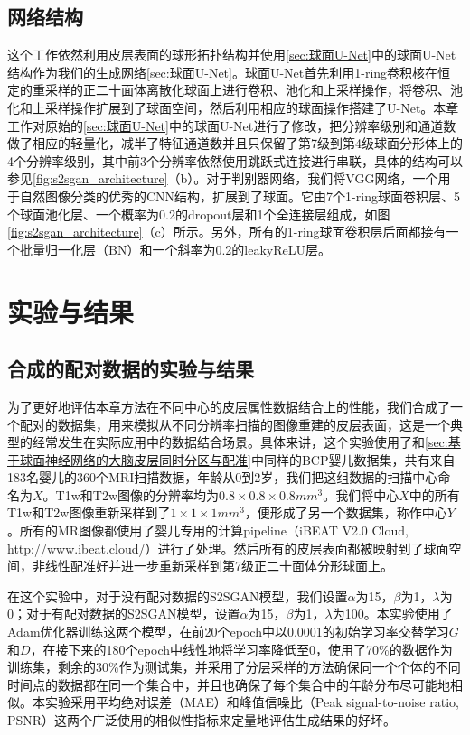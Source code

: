 \subsection{网络结构}
这个工作依然利用皮层表面的球形拓扑结构并使用\ref{sec:球面U-Net}中的球面U-Net结构作为我们的生成网络\ref{sec:球面U-Net}。球面U-Net首先利用1-ring卷积核在恒定的重采样的正二十面体离散化球面上进行卷积、池化和上采样操作，将卷积、池化和上采样操作扩展到了球面空间，然后利用相应的球面操作搭建了U-Net。本章工作对原始的\ref{sec:球面U-Net}中的球面U-Net进行了修改，把分辨率级别和通道数做了相应的轻量化，减半了特征通道数并且只保留了第7级到第4级球面分形体上的4个分辨率级别，其中前3个分辨率依然使用跳跃式连接进行串联，具体的结构可以参见\ref{fig:s2sgan_architecture}（b）。对于判别器网络，我们将VGG\cite{simonyan2014very}网络，一个用于自然图像分类的优秀的CNN结构，扩展到了球面。它由7个1-ring球面卷积层、5个球面池化层、一个概率为0.2的dropout层和1个全连接层组成，如图\ref{fig:s2sgan_architecture}（c）所示。另外，所有的1-ring球面卷积层后面都接有一个批量归一化层（BN）和一个斜率为0.2的leakyReLU层。

	

\section{实验与结果}

\subsection{合成的配对数据的实验与结果}\label{sec:Synthetic}
为了更好地评估本章方法在不同中心的皮层属性数据结合上的性能，我们合成了一个配对的数据集，用来模拟从不同分辨率扫描的图像重建的皮层表面，这是一个典型的经常发生在实际应用中的数据结合场景。具体来讲，这个实验使用了和\ref{sec:基于球面神经网络的大脑皮层同时分区与配准}中同样的BCP\cite{howell2019unc}婴儿数据集，共有来自183名婴儿的360个MRI扫描数据，年龄从0到2岁，我们把这组数据的扫描中心命名为$X$。T1w和T2w图像的分辨率均为$0.8\times 0.8\times 0.8mm^3$。我们将中心$X$中的所有T1w和T2w图像重新采样到了$1\times 1\times 1mm^3$，便形成了另一个数据集，称作中心$Y$。所有的MR图像都使用了婴儿专用的计算pipeline（iBEAT V2.0 Cloud, http://www.ibeat.cloud/）进行了处理。然后所有的皮层表面都被映射到了球面空间，非线性配准好并进一步重新采样到第7级正二十面体分形球面上。

在这个实验中，对于没有配对数据的S2SGAN模型，我们设置$\alpha$为15，$\beta$为1，$\lambda$为0；对于有配对数据的S2SGAN模型，设置$\alpha$为15，$\beta$为1，$\lambda$为100。本实验使用了Adam优化器训练这两个模型，在前20个epoch中以0.0001的初始学习率交替学习$G$和$D$，在接下来的180个epoch中线性地将学习率降低至0，使用了70\%的数据作为训练集，剩余的30\%作为测试集，并采用了分层采样的方法确保同一个个体的不同时间点的数据都在同一个集合中，并且也确保了每个集合中的年龄分布尽可能地相似。本实验采用平均绝对误差（MAE）和峰值信噪比（Peak signal-to-noise ratio, PSNR）这两个广泛使用的相似性指标来定量地评估生成结果的好坏。


